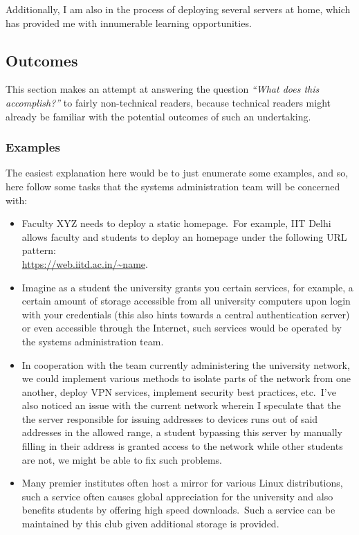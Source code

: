 \documentclass[a4paper,11pt,twocolumn,oneside]{book}
\begin{document}
    Additionally, I am also in the process of deploying several servers at home, which has provided me with innumerable
    learning opportunities.


    \subsection{Outcomes}\label{subsec:outcomes}
    This section makes an attempt at answering the question \emph{``What does this accomplish?''} to fairly
    non-technical readers, because technical readers might already be familiar with the potential outcomes of such an
    undertaking.

    \subsubsection{Examples}
    The easiest explanation here would be to just enumerate some examples, and so, here follow some tasks that the
    systems administration team will be concerned with:

    \begin{itemize}
        \item Faculty XYZ needs to deploy a static homepage.\ For example, IIT Delhi allows faculty and students to
        deploy an homepage under the following URL pattern:\\
        \href{https://web.iitd.ac.in/~name}{\color{blue}\url{https://web.iitd.ac.in/~name}}.
        \item Imagine as a student the university grants you certain services, for example, a certain amount of storage
        accessible from all university computers upon login with your credentials (this also hints towards a central
        authentication server) or even accessible through the Internet, such services would be operated by the systems
        administration team.
        \item In cooperation with the team currently administering the university network, we could implement various
        methods to isolate parts of the network from one another, deploy VPN services, implement security best
        practices, etc.\ I've also noticed an issue with the current network wherein I speculate that the the server
        responsible for issuing addresses to devices runs out of said addresses in the allowed range, a student
        bypassing this server by manually filling in their address is granted access to the network while other students
        are not, we might be able to fix such problems.
        \item Many premier institutes often host a mirror for various Linux distributions, such a service often causes
        global appreciation for the university and also benefits students by offering high speed downloads.\ Such a
        service can be maintained by this club given additional storage is provided.
    \end{itemize}
\end{document}
